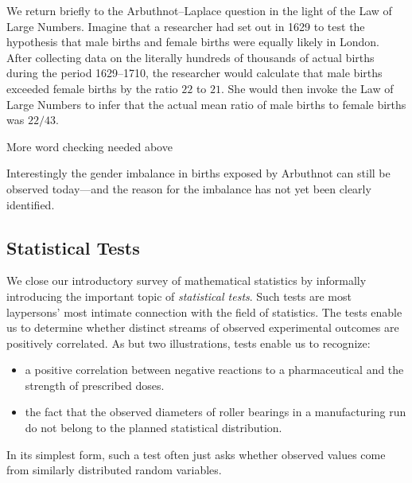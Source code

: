 \medskip

We return briefly to the Arbuthnot--Laplace question in the light of the Law of Large Numbers. 
Imagine that a researcher had set out in 1629 to test the hypothesis that male births and female births were equally likely in London.  After collecting data on the literally hundreds of thousands of actual births during the period 1629--1710, the researcher would calculate that male births exceeded female births by the ratio $22$ to $21$.  She would then invoke the Law of Large Numbers to infer that the actual mean ratio of male births to female births was $22/43$.


{\Arny More word checking needed above}

\medskip

\noindent
Interestingly the gender imbalance in births exposed by Arbuthnot can still be observed today---and the reason for the imbalance has not yet been clearly identified.

\subsection{Statistical Tests}
\label{sec:stat-tests}


We close our introductory survey of mathematical statistics by informally introducing the important topic of {\em statistical tests}.  Such tests are most laypersons' most intimate connection with the field of statistics.  The tests enable us to determine whether distinct streams of observed experimental outcomes are positively correlated.  As but two illustrations, tests enable us to recognize:
\begin{itemize}
\item
a positive correlation between negative reactions to a pharmaceutical and the strength of prescribed doses.  
\medskip\item
the fact that the observed diameters of roller bearings in a manufacturing run do not belong to the planned statistical distribution.
\end{itemize}
In its simplest form, such a test often just asks whether observed values come from similarly distributed random variables.

